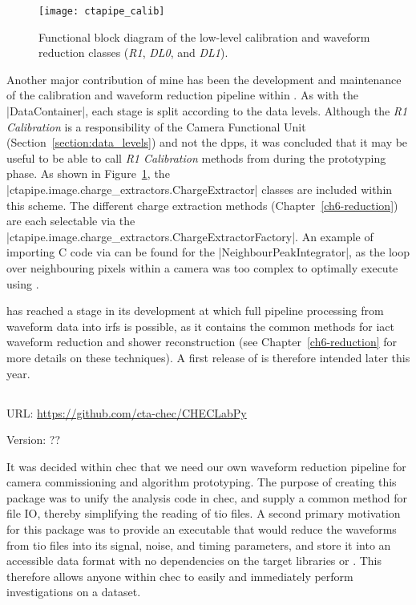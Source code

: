 \begin{figure}[t]
  \centering
  \texttt{[image: ctapipe\_calib]}
  \caption[Functional block diagram of the  low-level calibration classes.]{Functional block diagram of the  low-level calibration and waveform reduction classes (\textit{R1}, \textit{DL0}, and \textit{DL1}).}
  \label{fig:ctapipe_calib}
\end{figure}

Another major contribution of mine has been the development and maintenance of the calibration and waveform reduction pipeline within . As with the |DataContainer|, each stage is split according to the data levels. Although the \textit{R1 Calibration} is a responsibility of the Camera Functional Unit (Section~\ref{section:data_levels}) and not the \gls{dpps}, it was concluded that it may be useful to be able to call \textit{R1 Calibration} methods from  during the prototyping phase. As shown in Figure~\ref{fig:ctapipe_calib}, the |ctapipe.image.charge_extractors.ChargeExtractor| classes are included within this scheme. The different charge extraction methods (Chapter~\ref{ch6-reduction}) are each selectable via the |ctapipe.image.charge_extractors.ChargeExtractorFactory|. An example of importing C code via  can be found for the |NeighbourPeakIntegrator|, as the loop over neighbouring pixels within a camera was too complex to optimally execute using .

 has reached a stage in its development at which full pipeline processing from waveform data into \glspl{irf} is possible, as it contains the common methods for \gls{iact} waveform reduction and shower reconstruction (see Chapter~\ref{ch6-reduction} for more details on these techniques). A first release of  is therefore intended later this year.

\subsection{}
\vspace{-0.7em}
\noindent \hspace{\parindent} {\tiny URL: \url{https://github.com/cta-chec/CHECLabPy} \par}
\noindent \hspace{\parindent} {\tiny Version: ?? \par}

\noindent It was decided within \gls{chec} that we need our own waveform reduction pipeline for camera commissioning and algorithm prototyping. The purpose of creating this package was to unify the analysis code in \gls{chec}, and supply a common method for file IO, thereby simplifying the reading of \gls{tio} files. A second primary motivation for this package was to provide an executable that would reduce the waveforms from \gls{tio} files into its signal, noise, and timing parameters, and store it into an accessible data format with no dependencies on the \gls{target} libraries or . This therefore allows anyone within \gls{chec} to easily and immediately perform investigations on a dataset.

